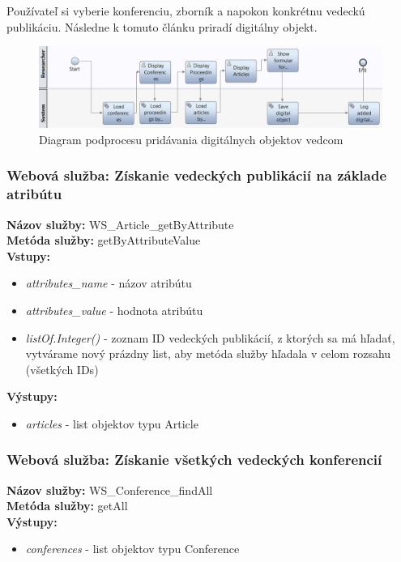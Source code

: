 \documentclass[10pt,oneside,slovak,a4paper]{article}
\begin{document}
Používateľ si vyberie konferenciu, zborník a napokon konkrétnu vedeckú publikáciu. Následne k tomuto článku priradí digitálny objekt.

\begin{figure} [H]
\centering
\includegraphics[scale=0.4]{diagrams/diagAddDigital.jpg} 
\caption{Diagram podprocesu pridávania digitálnych objektov vedcom}
\end{figure}

\subsubsection{Webová služba: Získanie vedeckých publikácií na základe atribútu}
\textbf{Názov služby:} WS\_Article\_getByAttribute\\
\textbf{Metóda služby:} getByAttributeValue\\
\textbf{Vstupy:}
	\begin{itemize}
		\item \textit{attributes\_name} - názov atribútu
		\item \textit{attributes\_value} - hodnota atribútu
		\item \textit{listOf.Integer()} - zoznam ID vedeckých publikácií, z ktorých sa má hľadať, vytvárame nový prázdny list, aby metóda služby hľadala v celom rozsahu (všetkých IDs)
	\end{itemize}
\textbf{Výstupy:}
	\begin{itemize}
		\item \textit{articles} - list objektov typu Article
	\end{itemize}

\subsubsection{Webová služba: Získanie všetkých vedeckých konferencií}
\textbf{Názov služby:} WS\_Conference\_findAll\\
\textbf{Metóda služby:} getAll\\
\textbf{Výstupy:}
	\begin{itemize}
		\item \textit{conferences} - list objektov typu Conference
	\end{itemize}
	
\end{document}
